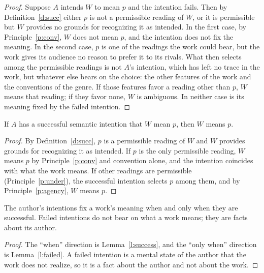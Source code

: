 \documentclass{situationist-preprint}
\begin{document}
\begin{proof}
Suppose $A$ intends $W$ to mean $p$ and the intention fails. Then by Definition~\ref{d:succ} either $p$ is not a permissible reading of $W$, or it is permissible but $W$ provides no grounds for recognizing it as intended. In the first case, by Principle~\ref{p:conv}, $W$ does not mean $p$, and the intention does not fix the meaning. In the second case, $p$ is one of the readings the work could bear, but the work gives its audience no reason to prefer it to its rivals. What then selects among the permissible readings is not $A$'s intention, which has left no trace in the work, but whatever else bears on the choice: the other features of the work and the conventions of the genre. If those features favor a reading other than $p$, $W$ means that reading; if they favor none, $W$ is ambiguous. In neither case is its meaning fixed by the failed intention.
\end{proof}

\begin{lemma}\label{l:success}
If $A$ has a successful semantic intention that $W$ mean $p$, then $W$ means $p$.
\end{lemma}

\begin{proof}
By Definition~\ref{d:succ}, $p$ is a permissible reading of $W$ and $W$ provides grounds for recognizing it as intended. If $p$ is the only permissible reading, $W$ means $p$ by Principle~\ref{p:conv} and convention alone, and the intention coincides with what the work means. If other readings are permissible (Principle~\ref{p:under}), the successful intention selects $p$ among them, and by Principle~\ref{p:agency}, $W$ means $p$.
\end{proof}

\begin{theorem}\label{t:main}
The author's intentions fix a work's meaning when and only when they are successful. Failed intentions do not bear on what a work means; they are facts about its author.
\end{theorem}

\begin{proof}
The \enquote{when} direction is Lemma~\ref{l:success}, and the \enquote{only when} direction is Lemma~\ref{l:failed}. A failed intention is a mental state of the author that the work does not realize, so it is a fact about the author and not about the work.
\end{proof}
\end{document}
